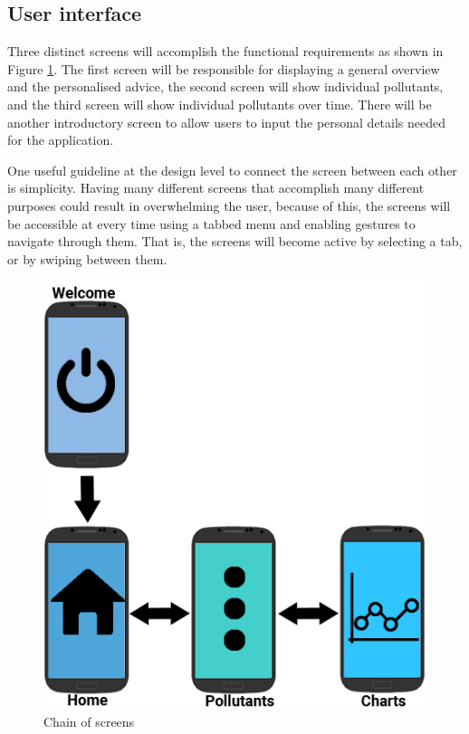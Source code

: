 \subsection{User interface}
Three distinct screens will accomplish the functional requirements as shown in Figure \ref{fig:chain_of_screens}. The first screen will be responsible for displaying a general overview and the personalised advice, the second screen will show individual pollutants, and the third screen will show individual pollutants over time. There will be another introductory screen to allow users to input the personal details needed for the application.

One useful guideline at the design level to connect the screen between each other is simplicity. Having many different screens that accomplish many different purposes could result in overwhelming the user, because of this, the screens will be accessible at every time using a tabbed menu and enabling gestures to navigate through them. That is, the screens will become active by selecting a tab, or by swiping between them.


\begin{figure}[H]
\begin{adjustbox}{width=.45\textwidth,center=\textwidth}
  \centering
  \includegraphics[scale=1]{images/screenChain.png}
\end{adjustbox}
  \caption[Chain of screens]{Chain of screens}
  \label{fig:chain_of_screens}
\end{figure}

